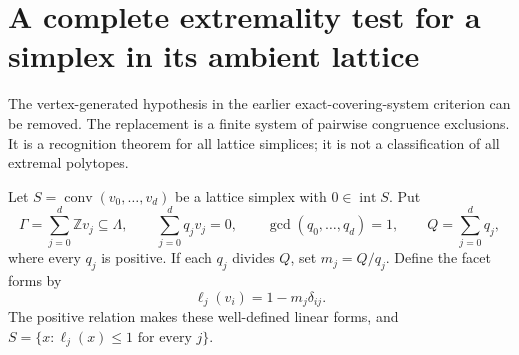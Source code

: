 \documentclass[11pt,a4paper]{article}
\theoremstyle{remark}\newtheorem{remark}[theorem]{Remark}
\begin{document}
\section{A complete extremality test for a simplex in its ambient lattice}
\label{eq:section}

The vertex-generated hypothesis in the earlier exact-covering-system
criterion can be removed.  The replacement is a finite system of
pairwise congruence exclusions.  It is a recognition theorem for all
lattice simplices; it is not a classification of all extremal polytopes.

Let $S=\operatorname{conv}(v_0,\ldots,v_d)$ be a lattice simplex with
$0\in\operatorname{int}S$. Put
\[
 \Gamma=\sum_{j=0}^{d}\mathbb Z v_j\subseteq\Lambda,
 \qquad \sum_{j=0}^{d}q_jv_j=0,
 \qquad \gcd(q_0,\ldots,q_d)=1,
 \qquad Q=\sum_{j=0}^{d}q_j,
\]
where every $q_j$ is positive.  If each $q_j$ divides $Q$, set
$m_j=Q/q_j$. Define the facet forms by
\begin{equation}\label{eq:facetforms}
 \ell_j(v_i)=1-m_j\delta_{ij}.
\end{equation}
The positive relation makes these well-defined linear forms, and
$S=\{x:\ell_j(x)\le1\text{ for every }j\}$.
\end{document}
